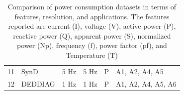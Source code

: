 \begin{table}
{\begin{tabular}{llccll}
            11                  & SynD                     & 5 Hz                           & 5 Hz                      & P                             & A1, A2, A4, A5         \\
            12                  & DEDDIAG                  & 1 Hz                           & 1 Hz                      & P                             & A1, A2, A4, A5, A6     \\ \hline
        \end{tabular}}
    \caption[Comparison of power consumption datasets in terms of features, resolution, and applications]{Comparison of power consumption datasets in terms of features, resolution, and applications. The features reported are current (I), voltage (V), active power (P), reactive power (Q), apparent power (S), normalized power (Np), frequency (f), power factor (pf), and Temperature (T)}
    \label{tab:datasets_applications}
\end{table}